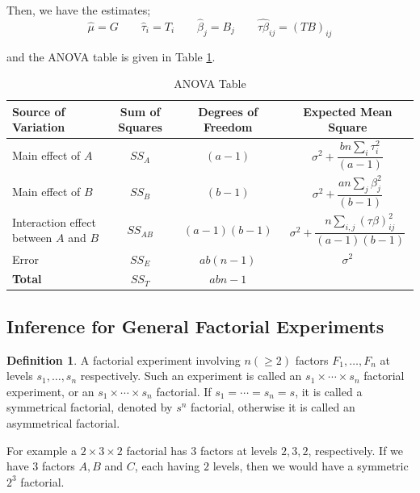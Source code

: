 \documentclass[12pt]{article}
\theoremstyle{definition}
\newtheorem{defn}{Definition}
\newenvironment{definition}{
\begin{tcolorbox}[colback=green!5!white,colframe=green!75!black, parbox = false]\begin{defn} }{\end{defn}\end{tcolorbox} }
\begin{document}
Then, we have the estimates;
$$
\hat{\mu} = G  \qquad
\hat{\tau}_i = T_i  \qquad 
\hat{\beta}_j = B_j  \qquad
\hat{\tau\beta}_{ij} = (TB)_{ij}
$$

and the ANOVA table is given in Table \ref{tbl:anova-two-factor}.

{\renewcommand{\arraystretch}{2.75}%
\begin{table}[h]
    \centering
    \begin{tabular}{|>{\centering\arraybackslash}m{3.5cm}|c|c|c|}
        \hline
         \textbf{Source of Variation} & \textbf{Sum of Squares} & \textbf{Degrees of Freedom} & \textbf{Expected Mean Square}\\
         \hline
         Main effect of $A$ & $SS_A$ & $(a-1)$ & $\sigma^2 + \dfrac{bn \sum_i \tau_i^2}{(a-1)}$\\
         Main effect of $B$ & $SS_B$ & $(b-1)$ & $\sigma^2 + \dfrac{an \sum_j \beta_j^2}{(b-1)}$\\
         Interaction effect between $A$ and $B$ & $SS_{AB}$ & $(a-1)(b-1)$ & $\sigma^2 + \dfrac{n \sum_{i,j} (\tau\beta)_{ij}^2}{(a-1)(b-1)}$\\
         Error & $SS_{E}$ & $ab(n-1)$ & $\sigma^2$\\
         \hline
        \textbf{Total} & $SS_{T}$ & $abn - 1$ & \\         
         \hline
    \end{tabular}
    \caption{ANOVA Table}
    \label{tbl:anova-two-factor}
\end{table}
}



\subsection{Inference for General Factorial Experiments}

\begin{definition}
    A factorial experiment involving $n (\geq 2)$ factors $F_1,\ldots,F_n$ at levels  $s_1,\dots, s_n$ respectively. Such an experiment is called  an $s_1 \times \cdots \times s_n$ factorial experiment, or an $s_1 \times \cdots \times s_n$ factorial.
    If $s_1= \cdots = s_n = s$, it is called a symmetrical  factorial, denoted by $s^n$ factorial, otherwise it is called an asymmetrical factorial.
\end{definition}

For example a $2\times 3\times 2$ factorial has 3 factors at levels $2,3,2$, respectively. If we have 3 factors $A, B$ and $C$, each having $2$ levels, then we would have a symmetric $2^3$ factorial.
\end{document}
